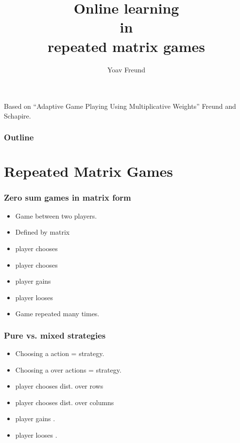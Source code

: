 \documentclass[handout]{beamer}
\title [Learning in repeated games] %
{Online learning \\ in \\ repeated matrix games}
\author[Freund] %
{Yoav Freund}
\institute[Universities of Somewhere and Elsewhere] %
\begin{document}
\begin{frame}
  \titlepage
Based on ``Adaptive Game Playing Using Multiplicative Weights'' Freund
and Schapire.
\end{frame}

\begin{frame}
  \frametitle{Outline}
  \tableofcontents[pausesections]
\end{frame}

\section{Repeated Matrix Games}

\begin{frame}
\frametitle{Zero sum games in matrix form}
\begin{itemize}
\item Game between two players.
\item Defined by  matrix \R{$\M$}
\item {} player chooses 
\item {} player chooses 
\item {} player gains 
\item {} player looses 
\item Game repeated many times.
\end{itemize}
\end{frame}

\begin{frame}
  \frametitle{Pure vs. mixed strategies}
  \begin{itemize}
  \item Choosing a  action =  strategy.
  \item Choosing a  over actions =  strategy.
  \item {} player chooses dist. over rows \R{$\P$}
  \item {} player chooses dist. over columns \R{$\Q$}
  \item {} player gains \R{$\M(\P,\Q)$}.
  \item {} player looses \R{$\M(\P,\Q)$}.
  \end{itemize}
\end{frame}
\end{document}
